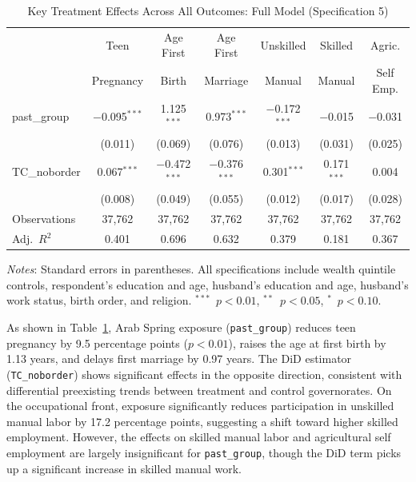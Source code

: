 \documentclass[12pt,a4paper]{article}
\begin{document}
\begin{table}[H]
\centering
\begin{threeparttable}
\caption{Key Treatment Effects Across All Outcomes: Full Model (Specification 5)}
\label{tab:key_effects}
\small
\begin{tabular}{@{}lcccccc@{}}
\toprule
 & \multicolumn{1}{c}{Teen} & \multicolumn{1}{c}{Age First} & \multicolumn{1}{c}{Age First} & \multicolumn{1}{c}{Unskilled} & \multicolumn{1}{c}{Skilled} & \multicolumn{1}{c}{Agric.} \\
 & \multicolumn{1}{c}{Pregnancy} & \multicolumn{1}{c}{Birth} & \multicolumn{1}{c}{Marriage} & \multicolumn{1}{c}{Manual} & \multicolumn{1}{c}{Manual} & \multicolumn{1}{c}{Self Emp.} \\
\midrule
past\_group  & $-$0.095$^{***}$ & 1.125$^{***}$ & 0.973$^{***}$ & $-$0.172$^{***}$ & $-$0.015 & $-$0.031 \\
             & (0.011) & (0.069) & (0.076) & (0.013) & (0.031) & (0.025) \\[4pt]
TC\_noborder & 0.067$^{***}$  & $-$0.472$^{***}$ & $-$0.376$^{***}$ & 0.301$^{***}$ & 0.171$^{***}$ & 0.004 \\
             & (0.008) & (0.049) & (0.055) & (0.012) & (0.017) & (0.028) \\[4pt]
\midrule
Observations & 37,762 & 37,762 & 37,762 & 37,762 & 37,762 & 37,762 \\
Adj.\ $R^2$  & 0.401  & 0.696  & 0.632  & 0.379  & 0.181  & 0.367 \\
\bottomrule
\end{tabular}
\begin{tablenotes}[flushleft]
\footnotesize
\item \textit{Notes}: Standard errors in parentheses. All specifications include wealth quintile controls, respondent's education and age, husband's education and age, husband's work status, birth order, and religion. $^{***}$~$p<0.01$, $^{**}$~$p<0.05$, $^{*}$~$p<0.10$.
\end{tablenotes}
\end{threeparttable}
\end{table}

\noindent As shown in Table~\ref{tab:key_effects}, Arab Spring exposure (\texttt{past\_group}) reduces teen pregnancy by 9.5 percentage points ($p<0.01$), raises the age at first birth by 1.13 years, and delays first marriage by 0.97 years. The DiD estimator (\texttt{TC\_noborder}) shows significant effects in the opposite direction, consistent with differential preexisting trends between treatment and control governorates. On the occupational front, exposure significantly reduces participation in unskilled manual labor by 17.2 percentage points, suggesting a shift toward higher skilled employment. However, the effects on skilled manual labor and agricultural self employment are largely insignificant for \texttt{past\_group}, though the DiD term picks up a significant increase in skilled manual work.
\vspace{0.25cm}
\end{document}
